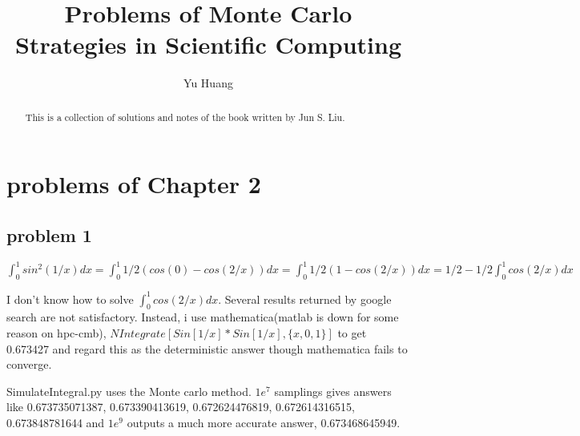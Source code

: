 \documentclass[a4paper,10pt]{article}
\title{Problems of Monte Carlo Strategies in Scientific Computing}
\author{Yu Huang}
\begin{document}
\maketitle

\begin{abstract}
This is a collection of solutions and notes of the book written by Jun S. Liu.
\end{abstract}
\tableofcontents

\section{problems of Chapter 2}
\subsection{problem 1}

\begin{math}
\int_{0}^{1} sin^2(1/x)dx = \int_{0}^{1}1/2(cos(0)-cos(2/x))dx = \int_{0}^{1}1/2(1-cos(2/x))dx = 1/2 - 1/2\int_{0}^{1}cos(2/x)dx
\end{math}

I don't know how to solve $\int_{0}^{1}cos(2/x)dx$. Several results returned by google search are not satisfactory. Instead, i use mathematica(matlab is down for some reason on hpc-cmb), $NIntegrate[Sin[1/x]*Sin[1/x], \{x, 0, 1\}]$ to get 0.673427 and regard this as the deterministic answer though mathematica fails to converge.

SimulateIntegral.py uses the Monte carlo method. $1e^7$ samplings gives answers like 0.673735071387, 0.673390413619, 0.672624476819, 0.672614316515, 0.673848781644 and $1e^9$ outputs a much more accurate answer, 0.673468645949.
\end{document}
